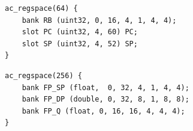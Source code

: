 \newsavebox{\codeboxone}
\begin{lrbox}{\codeboxone}
\begin{lstlisting}
ac_regspace(64) {
	bank RB (uint32, 0, 16, 4, 1, 4, 4);
	slot PC (uint32, 4, 60) PC;
	slot SP (uint32, 4, 52) SP;
}
\end{lstlisting}
\end{lrbox}

\newsavebox{\codeboxtwo}
\begin{lrbox}{\codeboxtwo}
\begin{lstlisting}
ac_regspace(256) {
	bank FP_SP (float,  0, 32, 4, 1, 4, 4);
	bank FP_DP (double, 0, 32, 8, 1, 8, 8);
	bank FP_Q (float, 0, 16, 16, 4, 4, 4);
}
\end{lstlisting}
\end{lrbox}




